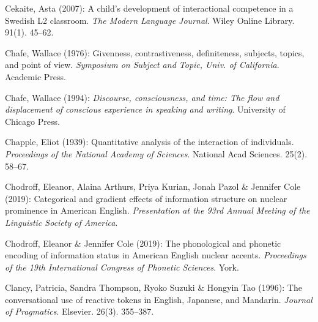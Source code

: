 \begin{styleBibliography}
Cekaite, Asta (2007): A child’s development of interactional competence in a Swedish L2 classroom. \textit{The Modern Language Journal}. Wiley Online Library. 91(1). 45–62.
\end{styleBibliography}

\begin{styleBibliography}
Chafe, Wallace (1976): Givenness, contrastiveness, definiteness, subjects, topics, and point of view. \textit{Symposium on Subject and Topic, Univ. of California}. Academic Press.
\end{styleBibliography}

\begin{styleBibliography}
Chafe, Wallace (1994): \textit{Discourse, consciousness, and time: The flow and displacement of conscious experience in speaking and writing}. University of Chicago Press.
\end{styleBibliography}

\begin{styleBibliography}
Chapple, Eliot (1939): Quantitative analysis of the interaction of individuals. \textit{Proceedings of the National Academy of Sciences}. National Acad Sciences. 25(2). 58–67.
\end{styleBibliography}

\begin{styleBibliography}
Chodroff, Eleanor, Alaina Arthurs, Priya Kurian, Jonah Pazol \& Jennifer Cole (2019): Categorical and gradient effects of information structure on nuclear prominence in American English. \textit{Presentation at the 93rd Annual Meeting of the Linguistic Society of America}.
\end{styleBibliography}

\begin{styleBibliography}
Chodroff, Eleanor \& Jennifer Cole (2019): The phonological and phonetic encoding of information status in American English nuclear accents. \textit{Proceedings of the 19th International Congress of Phonetic Sciences}. York.
\end{styleBibliography}

\begin{styleBibliography}
Clancy, Patricia, Sandra Thompson, Ryoko Suzuki \& Hongyin Tao (1996): The conversational use of reactive tokens in English, Japanese, and Mandarin. \textit{Journal of Pragmatics}. Elsevier. 26(3). 355–387.
\end{styleBibliography}

